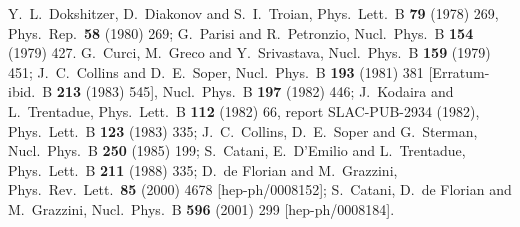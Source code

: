 \documentclass[12pt]{article}
\begin{document}
\begin{thebibliography}{99}
Y.~L.~Dokshitzer, D.~Diakonov and S.~I.~Troian,
Phys.\ Lett.\  B {\bf 79} (1978) 269,
Phys.\ Rep.\  {\bf 58} (1980) 269;
G.~Parisi and R.~Petronzio,
Nucl.\ Phys.\ B {\bf 154} (1979) 427.
G.~Curci, M.~Greco and Y.~Srivastava,
Nucl.\ Phys.\ B {\bf 159} (1979) 451;
J.~C.~Collins and D.~E.~Soper,
Nucl.\ Phys.\ B {\bf 193} (1981) 381
[Erratum-ibid.\ B {\bf 213} (1983) 545],
Nucl.\ Phys.\ B {\bf 197} (1982) 446;
J.~Kodaira and L.~Trentadue,
Phys.\ Lett.\ B {\bf 112} (1982) 66,
report SLAC-PUB-2934 (1982),
Phys.\ Lett.\ B {\bf 123} (1983) 335;
J.~C.~Collins, D.~E.~Soper and G.~Sterman,
Nucl.\ Phys.\ B {\bf 250} (1985) 199;
S.~Catani, E.~D'Emilio and L.~Trentadue,
Phys.\ Lett.\ B {\bf 211} (1988) 335;
  D.~de Florian and M.~Grazzini,
  Phys.\ Rev.\ Lett.\  {\bf 85} (2000) 4678
[hep-ph/0008152];
  S.~Catani, D.~de Florian and M.~Grazzini,
  Nucl.\ Phys.\  B {\bf 596} (2001) 299
[hep-ph/0008184].


\end{thebibliography}
\end{document}
